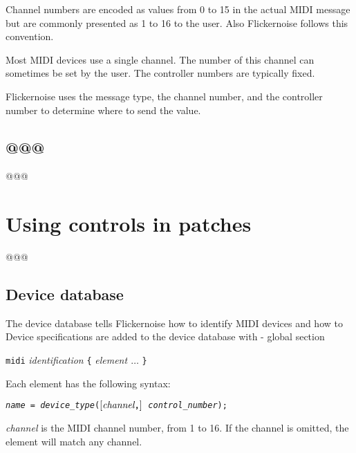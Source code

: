 \documentclass[11pt,a4paper]{article}
\newenvironment{expose}{\vskip3mm\qquad\begin{raggedright}}{%
\end{raggedright}\vskip3mm}
\begin{document}
Channel numbers are encoded as values from 0 to 15 in the actual
MIDI message but are commonly presented as 1 to 16 to the user.
Also Flickernoise follows this convention.

Most MIDI devices use a single channel. The number of this channel
can sometimes be set by the user. The controller numbers are typically
fixed.

Flickernoise uses the message type, the channel number, and the controller
number to determine where to send the value. 




\subsection{@@@}


@@@



\section{Using controls in patches}

@@@



\subsection{Device database}

The device database tells Flickernoise how to identify MIDI
devices and how to 
Device specifications are added to the device database with 
- global section

\begin{expose}
{\tt midi} {\em identification} \verb"{" {\em element $\ldots$} \verb"}"
\end{expose}

Each element has the following syntax:

\begin{expose}
{\tt {\em name} =
  {\em device\_type}($\left[\hbox{\em channel}\verb","\right]$
  {\em control\_number});}
\end{expose}

{\em channel} is the MIDI channel number, from 1 to 16. If the channel
is omitted, the element will match any channel.
\end{document}
